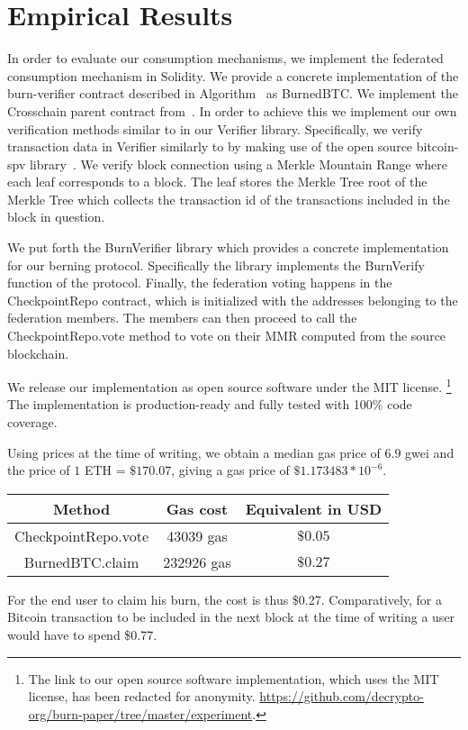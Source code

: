 \section{Empirical Results}

\newcommand{\rref}[1]{}

In order to evaluate our consumption mechanisms, we implement the federated consumption mechanism in Solidity. We provide a concrete implementation of the \textsf{burn-verifier} contract described in Algorithm~\rref{alg.burn-verifier} as \textsf{BurnedBTC}. We implement the \textsf{Crosschain} parent contract from~\cite{pow-sidechains}. In order to achieve this we implement our own verification methods similar to \rref{alg.verify-event-federation} in our \textsf{Verifier} library. Specifically, we verify transaction data in \textsf{Verifier} similarly to \rref{alg.verify-tx} by making use of the open source bitcoin-spv library~\cite{bitcoin-spv-library}. We verify block connection using a Merkle Mountain Range where each leaf corresponds to a block. The leaf stores the Merkle Tree root of the Merkle Tree which collects the transaction id of the transactions included in the block in question.

We put forth the \textsf{BurnVerifier} library which provides a concrete implementation for our berning protocol. Specifically the library implements the \textsf{BurnVerify} function of the protocol. Finally, the federation voting happens in the \textsf{CheckpointRepo} contract, which is initialized with the addresses belonging to the federation members. The members can then proceed to call the \textsf{CheckpointRepo.vote} method to vote on their MMR computed from the source blockchain.

We release our implementation as open source software under the MIT license.
\footnote{
    \ifanonymous
        The link to our open source software implementation, which uses the MIT license, has been redacted for anonymity.
    \else
        \url{https://github.com/decrypto-org/burn-paper/tree/master/experiment}.
    \fi
}
The implementation is production-ready and fully tested with 100\% code coverage.

Using prices at the time of writing, we obtain a median gas price of $6.9$ gwei and the price of $1$ ETH = $\$170.07$, giving a gas price of $\$1.173483 * 10^{-6}$.

\begin{center}
    \begin{tabular}{ |c|c|c| }
     \hline
     Method & Gas cost & Equivalent in USD \\
     \hline
     \textsf{CheckpointRepo.vote} & 43039 gas & $\$0.05$ \\
     \textsf{BurnedBTC.claim} & 232926 gas & $\$0.27$ \\
     \hline
    \end{tabular}
\end{center}

For the end user to claim his burn, the cost is thus \$0.27. Comparatively, for a Bitcoin transaction to be included in the next block at the time of writing a user would have to spend \$0.77.
